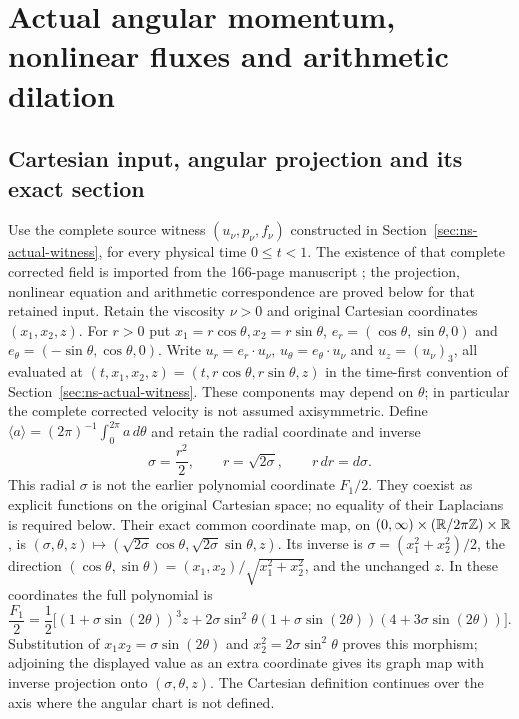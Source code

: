 \section{Actual angular momentum, nonlinear fluxes and arithmetic dilation}
\label{sec:ns-angular-mellin}

\subsection{Cartesian input, angular projection and its exact section}

Use the complete source witness $(u_\nu,p_\nu,f_\nu)$ constructed in
Section~\ref{sec:ns-actual-witness}, for every physical time
$0\leq t<1$. The existence of that complete corrected field is
imported from the 166-page manuscript \cite{openaiNS2026release};
the projection, nonlinear equation and arithmetic correspondence are
proved below for that retained input. Retain
the viscosity $\nu>0$ and original Cartesian coordinates $(x_1,x_2,z)$.
For $r>0$ put $x_1=r\cos\theta,x_2=r\sin\theta$,
$e_r=(\cos\theta,\sin\theta,0)$ and
$e_\theta=(-\sin\theta,\cos\theta,0)$. Write
$u_r=e_r\cdot u_\nu$, $u_\theta=e_\theta\cdot u_\nu$ and
$u_z=(u_\nu)_3$, all evaluated at
$(t,x_1,x_2,z)=(t,r\cos\theta,r\sin\theta,z)$ in the
time-first convention of Section~\ref{sec:ns-actual-witness}. These components may depend on $\theta$; in particular
the complete corrected velocity is not assumed axisymmetric.
Define $\langle a\rangle=(2\pi)^{-1}\int_0^{2\pi}a\,d\theta$ and
retain the radial coordinate and inverse
\[
 \sigma=\frac{r^2}{2},\qquad r=\sqrt{2\sigma},\qquad
 r\,dr=d\sigma.
\]
This radial $\sigma$ is not the earlier polynomial coordinate $F_1/2$.
They coexist as explicit functions on the original Cartesian space;
no equality of their Laplacians is required below.
Their exact common coordinate map, on
$(0,\infty)\times(\mathbb R/2\pi\mathbb Z)\times\mathbb R$, is
$(\sigma,\theta,z)\mapsto
(\sqrt{2\sigma}\cos\theta,\sqrt{2\sigma}\sin\theta,z)$.
Its inverse is $\sigma=(x_1^2+x_2^2)/2$, the direction
$(\cos\theta,\sin\theta)=(x_1,x_2)/\sqrt{x_1^2+x_2^2}$,
and the unchanged $z$. In these coordinates the full polynomial is
\[
 \frac{F_1}{2}=\frac12\bigl[
 (1+\sigma\sin(2\theta))^3z
 +2\sigma\sin^2\theta(1+\sigma\sin(2\theta))
                         (4+3\sigma\sin(2\theta))\bigr].
\]
Substitution of $x_1x_2=\sigma\sin(2\theta)$ and
$x_2^2=2\sigma\sin^2\theta$ proves this morphism; adjoining the
displayed value as an extra coordinate gives its graph map with
inverse projection onto $(\sigma,\theta,z)$. The Cartesian definition
continues over the axis where the angular chart is not defined.

